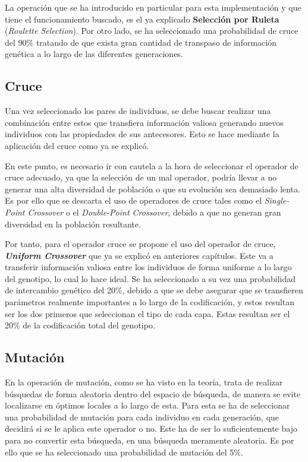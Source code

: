 La operación que se ha introducido en particular para esta implementación y que tiene el funcionamiento buscado, es el ya explicado \textbf{Selección por Ruleta} (\textit{Roulette Selection}). Por otro lado, se ha seleccionado una probabilidad de cruce del 90\% tratando de que exista gran cantidad de transpaso de información genética a lo largo de las diferentes generaciones.

\subsection{Cruce}

Una vez seleccionado los pares de individuos, se debe buscar realizar una combinación entre estos que transfiera información valiosa generando nuevos individuos con las propiedades de sus antecesores. Esto se hace mediante la aplicación del cruce como ya se explicó.

En este punto, es necesario ir con cautela a la hora de seleccionar el operador de cruce adecuado, ya que la selección de un mal operador, podría llevar a no generar una alta diversidad de población o que su evolución sea demasiado lenta. Es por ello que se descarta el uso de operadores de cruce tales como el \textit{Single-Point Crossover} o el \textit{Double-Point Crossover}, debido a que no generan gran diversidad en la población resultante.

Por tanto, para el operador cruce se propone el uso del operador de cruce, \textbf{\textit{Uniform Crossover}} que ya se explicó en anteriores capítulos. Este va a transferir información valiosa entre los individuos de forma uniforme a lo largo del genotipo, lo cual lo hace ideal. Se ha seleccionado a su vez una probabilidad de intercambio genético del 20\%, debido a que se debe asegurar que se transfieren parámetros realmente importantes a lo largo de la codificación, y estos resultan ser los dos primeros que seleccionan el tipo de cada capa. Estas resultan ser el 20\% de la codificación total del genotipo.

\subsection{Mutación}

En la operación de mutación, como se ha visto en la teoría, trata de realizar búsquedas de forma aleatoria dentro del espacio de búsqueda, de manera se evite localizarse en óptimos locales a lo largo de esta. Para esta se ha de seleccionar una probabilidad de mutación para cada individuo en cada generación, que decidirá si se le aplica este operador o no. Este ha de ser lo suficientemente bajo para no convertir esta búsqueda, en una búsqueda meramente aleatoria. Es por ello que se ha seleccionado una probabilidad de mutación del 5\%.

